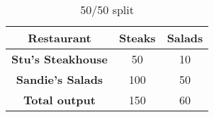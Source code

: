 \begin{table}
    \begin{tabular}{|c|c|c|}
      \hline
      \textbf{Restaurant} & \textbf{Steaks} & \textbf{Salads} \\
      \hline
      \textbf{Stu's Steakhouse} & 50 & 10 \\
      \hline
      \textbf{Sandie's Salads} & 100 & 50 \\
      \hline
      \textbf{Total output} & 150 & 60 \\
      \hline
    \end{tabular}
    \caption{50/50 split}
  \end{table}